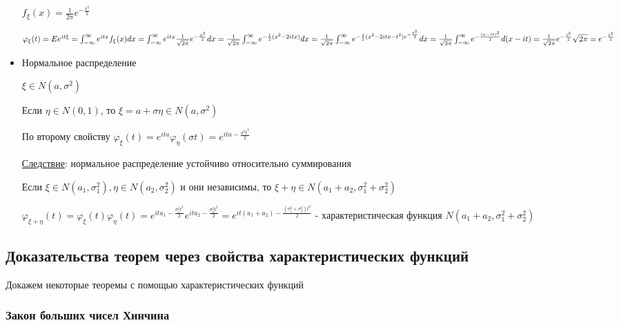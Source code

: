 \documentclass[12pt]{article}
\begin{document}
\begin{itemize}
    $f_\xi(x) = \frac{1}{2\pi} e^{-\frac{x^2}{2}}$

    $\varphi_\xi(t) = Ee^{it\xi} = \int_{-\infty}^{\infty} e^{itx} f_\xi(x) dx = \int_{-\infty}^\infty e^{itx} \frac{1}{\sqrt{2\pi}} e^{-\frac{x^2}{2}} dx = 
    \frac{1}{\sqrt{2\pi}} \int_{-\infty}^\infty e^{-\frac{1}{2}(x^2 - 2itx)} dx = \\
    \frac{1}{\sqrt{2\pi}} \int_{-\infty}^{\infty} e^{-\frac{1}{2}(x^2 - 2itx - t^2) e^{-\frac{t^2}{2}}} dx = 
    \frac{1}{\sqrt{2\pi}} \int_{-\infty}^{\infty} e^{-\frac{(x - it)^2}{2}} d(x - it) = \frac{1}{\sqrt{2\pi}} e^{-\frac{t^2}{2}} \sqrt{2\pi} = e^{-\frac{t^2}{2}}$

    \item Нормальное распределение

    $\xi \in N(a, \sigma^2)$

    Если $\eta \in N(0, 1)$, то $\xi = a + \sigma \eta \in N(a, \sigma^2)$

    По второму свойству $\varphi_\xi(t) = e^{ita} \varphi_\eta(\sigma t) = e^{ita - \frac{\sigma^2t^2}{2}}$

    \underline{Следствие}: нормальное распределение устойчиво относительно суммирования

    \begin{MyTheorem}
        Если $\xi \in N(a_1, \sigma_1^2), \eta \in N(a_2, \sigma^2_2)$ и они независимы, то $\xi + \eta \in N(a_1 + a_2, \sigma_1^2 + \sigma_2^2)$
    \end{MyTheorem}

    \begin{MyProof}
        $\varphi_{\xi + \eta}(t) = \varphi_\xi(t) \varphi_\eta(t) = e^{ita_1 - \frac{\sigma_1^2t^2}{2}} e^{ita_2 - \frac{\sigma_2^2t^2}{2}} = e^{it(a_1 + a_2) - \frac{(\sigma_1^2 + \sigma_2^2)t^2}{2}}$ - 
        характеристическая функция $N(a_1 + a_2, \sigma_1^2 + \sigma_2^2)$
    \end{MyProof}
\end{itemize}

\mediumvspace

\subsection{Доказательства теорем через свойства характеристических функций}

Докажем некоторые теоремы с помощью характеристических функций

\subsubsection{Закон больших чисел Хинчина}
\end{document}
